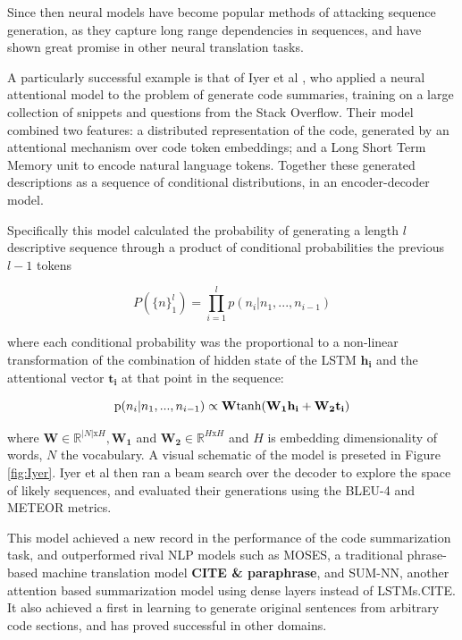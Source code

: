 Since then neural models have become popular methods of attacking sequence generation, as they capture long range dependencies in sequences, and have shown great promise in other neural translation tasks.

A particularly successful example is that of Iyer et al \cite{iyer_summarizing_2016}, who applied a neural attentional model to the problem of generate code summaries, training on a large collection of snippets and questions from the Stack Overflow.   Their model combined two features: a distributed representation of the code, generated by an attentional mechanism \cite{luong_effective_2015} over code token embeddings; and a Long Short Term Memory unit \cite{hochreiter_long_1997} to encode natural language tokens. Together these generated descriptions as a sequence of conditional distributions, in an encoder-decoder model. 

Specifically this model calculated the probability of generating a length $l$
descriptive sequence through a product of conditional probabilities the previous $l-1$ tokens

$$P(\{n\}_1^l) = \prod_{i=1}^lp(n_i | n_1, ..., n_{i-1} ) $$

where each conditional probability was the proportional to a non-linear transformation of the combination of hidden state of the LSTM $\mathbf{h_i}$ and the attentional vector  $\mathbf{t_i}$ at that point in the sequence: 

$$\text p(n_i | n_1, ..., n_{i-1} ) \propto \mathbf{W}\text{tanh}(\mathbf{W_1h_i} + \mathbf{W_2t_i})$$

where $\mathbf{W} \in \mathbb{R}^{|N|\text{x} H}, \mathbf{W_1}$ and $\mathbf{W_2} \in \mathbb{R}^{H \text{x} H}$  and $ H$ is embedding dimensionality of words, $ N $ the vocabulary.\cite{iyer_summarizing_2016}
A visual schematic of the model is preseted in Figure \ref{fig:Iyer}.
Iyer et al then ran a beam search over the decoder to explore the space of likely sequences, and evaluated their generations using the BLEU-4 and METEOR metrics.

This model achieved a new record in the performance of the code summarization task, and outperformed rival NLP models such as MOSES, a traditional phrase-based machine translation model \textbf{CITE \& paraphrase}, and SUM-NN, another attention based summarization model using dense layers instead of LSTMs.CITE. It also achieved a first in learning to generate original sentences from arbitrary code sections, and has proved successful in other domains.  

